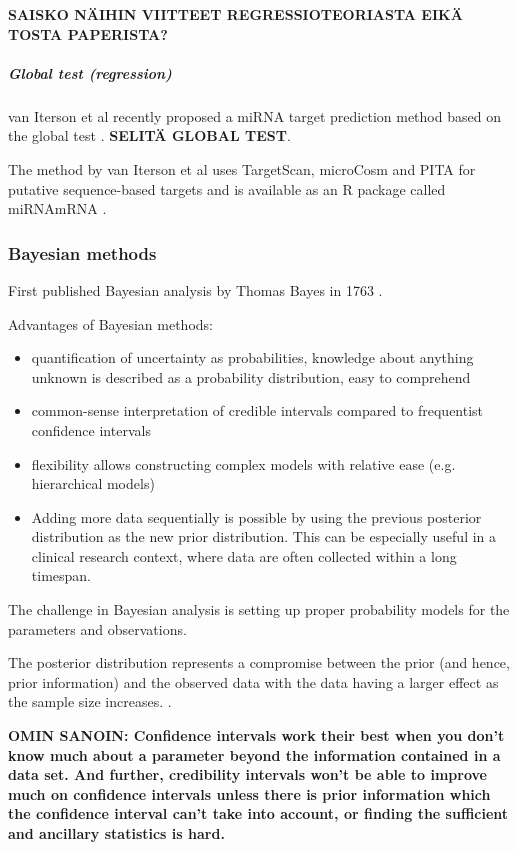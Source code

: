 \textbf{SAISKO NÄIHIN VIITTEET REGRESSIOTEORIASTA EIKÄ TOSTA PAPERISTA?}


\subparagraph{Global test (regression)}\label{global-test-regression}

van Iterson et al recently proposed a miRNA target prediction method based on
the global test \citep{vanIterson2013}. \textbf{SELITÄ GLOBAL TEST}.

The method by van Iterson et al uses TargetScan, microCosm and PITA for
putative sequence-based targets and is available as an R package called
miRNAmRNA \citep{vanItersonWeb}.





\subsubsection{Bayesian methods}\label{bayesian-methods}

First published Bayesian analysis by Thomas Bayes in 1763 \citep{Gelman2013}.

Advantages of Bayesian methods:
\begin{itemize}
  \item
  quantification of uncertainty as probabilities, knowledge about anything
  unknown is described as a probability distribution, easy to comprehend
  \item
  common-sense interpretation of credible intervals compared to frequentist
  confidence intervals
  \item
  flexibility allows constructing complex models with relative ease (e.g.
  hierarchical models)
  \item
  Adding more data sequentially is possible by using the previous posterior
  distribution as the new prior distribution. This can be especially useful in
  a clinical research context, where data are often collected within a long
  timespan.
\end{itemize}
The challenge in Bayesian analysis is setting up proper probability models for
the parameters and observations. \citep{Gelman2013}

The posterior distribution represents a compromise between the prior (and
hence, prior information) and the observed data with the data having a larger
effect as the sample size increases. \citep{Gelman2013}.

\textbf{OMIN SANOIN: Confidence intervals work their best when you don't know much about a
parameter beyond the information contained in a data set. And further,
credibility intervals won't be able to improve much on confidence intervals
unless there is prior information which the confidence interval can't take
into account, or finding the sufficient and ancillary statistics is hard.}

